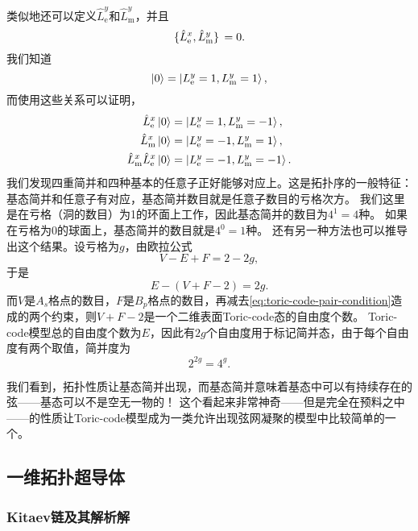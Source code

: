 \documentclass[hyperref, UTF8, a4paper]{ctexart}
\begin{document}
类似地还可以定义$\hat{L}^y_\text{e}$和$\hat{L}^y_\text{m}$，并且
\begin{equation}
    \acomm*{\hat{L}^x_\text{e}}{\hat{L}^y_\text{m}} = 0.
\end{equation}
我们知道
\begin{equation}
    \ket{0} = \ket{L_\text{e}^y=1, L_\text{m}^y=1},
\end{equation}
而使用这些关系可以证明，
\begin{equation}
    \begin{aligned}
        \hat{L}^x_\text{e} \ket{0} &= \ket{L_\text{e}^y=1, L_\text{m}^y=-1}, \\
        \hat{L}^x_\text{m} \ket{0} &= \ket{L_\text{e}^y=-1, L_\text{m}^y=1}, \\
        \hat{L}^x_\text{m} \hat{L}^x_\text{e} \ket{0} &= \ket{L_\text{e}^y=-1, L_\text{m}^y=-1}.
    \end{aligned}
\end{equation}
我们发现四重简并和四种基本的任意子正好能够对应上。这是拓扑序的一般特征：基态简并和任意子有对应，基态简并数目就是任意子数目的亏格次方。
我们这里是在亏格（洞的数目）为1的环面上工作，因此基态简并的数目为$4^1=4$种。
如果在亏格为0的球面上，基态简并的数目就是$4^0=1$种。
还有另一种方法也可以推导出这个结果。设亏格为$g$，由欧拉公式
\[
    V - E + F = 2 - 2g,
\]
于是
\[
    E - (V + F - 2) = 2g.
\]
而$V$是$A_s$格点的数目，$F$是$B_p$格点的数目，再减去\eqref{eq:toric-code-pair-condition}造成的两个约束，则$V+F-2$是一个二维表面Toric-code态的自由度个数。
Toric-code模型总的自由度个数为$E$，因此有$2g$个自由度用于标记简并态，由于每个自由度有两个取值，简并度为
\[
    2^{2g} = 4^g.
\]

我们看到，拓扑性质让基态简并出现，而基态简并意味着基态中可以有持续存在的弦——基态可以不是空无一物的！
这个看起来非常神奇——但是完全在预料之中——的性质让Toric-code模型成为一类允许出现弦网凝聚的模型中比较简单的一个。

\subsection{一维拓扑超导体}

\subsubsection{Kitaev链及其解析解}
\end{document}
